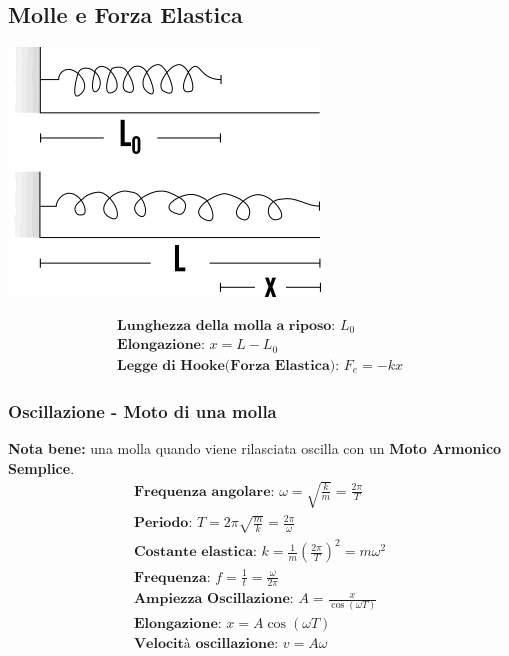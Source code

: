 \subsection{Molle e Forza Elastica}
\begin{center}
\includegraphics[width=0.4 \linewidth]{Dinamica/forza-elastica.png} 
\end{center}
\begin{gather*}
    \textbf{Lunghezza della molla a riposo: } L_0 \\
    \textbf{Elongazione: } x = L - L_0 \\
    \textbf{Legge di Hooke(Forza Elastica): } F_e = -k x 
\end{gather*}
\subsubsection{Oscillazione - Moto di una molla}
\textbf{Nota bene: } una molla quando viene rilasciata oscilla con un \textbf{Moto Armonico Semplice}.
\begin{gather*}
    \textbf{Frequenza angolare: } \omega = \sqrt{\frac{k}{m}} = \frac{2 \pi}{T} \\
    \textbf{Periodo: } T = 2 \pi \sqrt{\frac{m}{k}} = \frac{2 \pi}{\omega} \\
    \textbf{Costante elastica: } k = \frac{1}{m} (\frac{2 \pi}{T})^2 = m \omega^2 \\
    \textbf{Frequenza: } f = \frac{1}{t} = \frac{\omega}{2 \pi} \\
    \textbf{Ampiezza Oscillazione: } A = \frac{x}{\cos (\omega T)} \\
    \textbf{Elongazione: } x = A \cos (\omega T) \\
    \textbf{Velocità oscillazione: } v = A \omega
\end{gather*}